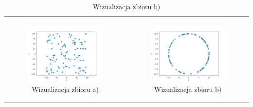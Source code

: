 \documentclass[a4paper]{article}
\begin{document}
\begin{table}[H]
    \centering
    \begin{tabular}{cc}
        
        \begin{subfigure}{0.5\textwidth}
            \includegraphics[width=\columnwidth]{points_a.png}
            \caption{Wizualizacja zbioru a)}
            \label{fig:points_a}
        \end{subfigure} & 
        \begin{subfigure}{0.5\textwidth}
            \includegraphics[width=\columnwidth]{points_b.png}
            \caption{Wizualizacja zbioru b)}
            \label{fig:points_b}
        \end{subfigure} \\


\end{tabular}
\end{table}
\end{document}
